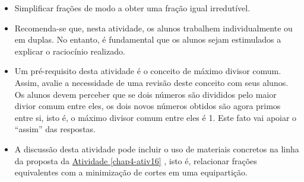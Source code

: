 \newpage
\begin{multicols}{2}


\begin{objetivos}[label=chap4-ativ17]{}{}
\begin{itemize} %
    \item       Simplificar frações de modo a obter uma fração igual
irredutível.
\end{itemize} %

\end{objetivos}

\begin{orientacoes}{}{}

\begin{itemize} %
    \item       Recomenda-se que, nesta atividade, os alunos trabalhem
individualmente ou em duplas. No entanto, é fundamental que os alunos sejam
estimulados a explicar o raciocínio realizado.
    \item       Um pré-requisito desta atividade é o conceito de máximo divisor
comum. Assim, avalie a necessidade de uma revisão deste conceito com seus
alunos. Os alunos devem perceber que se dois números são divididos pelo maior
divior comum entre eles, os dois novos números obtidos são agora primos entre
si, isto é, o máximo divisor comum entre eles é 1. Este fato vai apoiar o
``assim''       das respostas.
    \item       A discussão desta atividade pode incluir o uso de materiais
concretos na linha da proposta da \hyperref[chap4-ativ16]{Atividade \ref{chap4-ativ16}}      , isto é, relacionar
frações equivalentes com a minimização de cortes em uma equipartição.
\end{itemize} %




\end{orientacoes}


\end{multicols}
